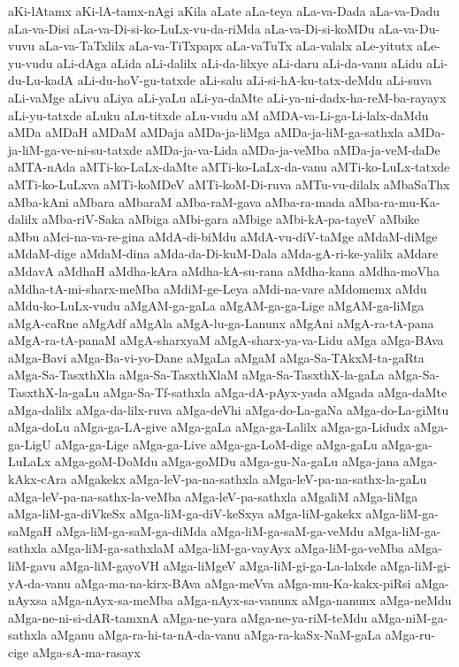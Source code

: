 {aKi-lAtamx
aKi-lA-tamx-nAgi
aKila
aLate
aLa-teya
aLa-va-Dada
aLa-va-Dadu
aLa-va-Disi
aLa-va-Di-si-ko-LuLx-vu-da-riMda
aLa-va-Di-si-koMDu
aLa-va-Du-vuvu
aLa-va-TaTxlilx
aLa-va-TiTxpapx
aLa-vaTuTx
aLa-valalx
aLe-yitutx
aLe-yu-vudu
aLi-dAga
aLida
aLi-dalilx
aLi-da-lilxye
aLi-daru
aLi-da-vanu
aLidu
aLi-du-Lu-kadA
aLi-du-hoV-gu-tatxde
aLi-salu
aLi-si-hA-ku-tatx-deMdu
aLi-suva
aLi-vaMge
aLivu
aLiya
aLi-yaLu
aLi-ya-daMte
aLi-ya-ni-dadx-ha-reM-ba-rayayx
aLi-yu-tatxde
aLuku
aLu-titxde
aLu-vudu
aM
aMDA-va-Li-ga-Li-lalx-daMdu
aMDa
aMDaH
aMDaM
aMDaja
aMDa-ja-liMga
aMDa-ja-liM-ga-sathxla
aMDa-ja-liM-ga-ve-ni-su-tatxde
aMDa-ja-va-Lida
aMDa-ja-veMba
aMDa-ja-veM-daDe
aMTA-nAda
aMTi-ko-LaLx-daMte
aMTi-ko-LaLx-da-vanu
aMTi-ko-LuLx-tatxde
aMTi-ko-LuLxva
aMTi-koMDeV
aMTi-koM-Di-ruva
aMTu-vu-dilalx
aMbaSaThx
aMba-kAni
aMbara
aMbaraM
aMba-raM-gava
aMba-ra-mada
aMba-ra-mu-Ka-dalilx
aMba-riV-Saka
aMbiga
aMbi-gara
aMbige
aMbi-kA-pa-tayeV
aMbike
aMbu
aMci-na-va-re-gina
aMdA-di-biMdu
aMdA-vu-diV-taMge
aMdaM-diMge
aMdaM-dige
aMdaM-dina
aMda-da-Di-kuM-Dala
aMda-gA-ri-ke-yalilx
aMdare
aMdavA
aMdhaH
aMdha-kAra
aMdha-kA-su-rana
aMdha-kana
aMdha-moVha
aMdha-tA-mi-sharx-meMba
aMdiM-ge-Leya
aMdi-na-vare
aMdomemx
aMdu
aMdu-ko-LuLx-vudu
aMgAM-ga-gaLa
aMgAM-ga-ga-Lige
aMgAM-ga-liMga
aMgA-caRne
aMgAdf
aMgAla
aMgA-lu-ga-Lanunx
aMgAni
aMgA-ra-tA-pana
aMgA-ra-tA-panaM
aMgA-sharxyaM
aMgA-sharx-ya-va-Lidu
aMga
aMga-BAva
aMga-Bavi
aMga-Ba-vi-yo-Dane
aMgaLa
aMgaM
aMga-Sa-TAkxM-ta-gaRta
aMga-Sa-TasxthXla
aMga-Sa-TasxthXlaM
aMga-Sa-TasxthX-la-gaLa
aMga-Sa-TasxthX-la-gaLu
aMga-Sa-Tf-sathxla
aMga-dA-pAyx-yada
aMgada
aMga-daMte
aMga-dalilx
aMga-da-lilx-ruva
aMga-deVhi
aMga-do-La-gaNa
aMga-do-La-giMtu
aMga-doLu
aMga-ga-LA-give
aMga-gaLa
aMga-ga-Lalilx
aMga-ga-Lidudx
aMga-ga-LigU
aMga-ga-Lige
aMga-ga-Live
aMga-ga-LoM-dige
aMga-gaLu
aMga-ga-LuLaLx
aMga-goM-DoMdu
aMga-goMDu
aMga-gu-Na-gaLu
aMga-jana
aMga-kAkx-cAra
aMgakekx
aMga-leV-pa-na-sathxla
aMga-leV-pa-na-sathx-la-gaLu
aMga-leV-pa-na-sathx-la-veMba
aMga-leV-pa-sathxla
aMgaliM
aMga-liMga
aMga-liM-ga-diVkeSx
aMga-liM-ga-diV-keSxya
aMga-liM-gakekx
aMga-liM-ga-saMgaH
aMga-liM-ga-saM-ga-diMda
aMga-liM-ga-saM-ga-veMdu
aMga-liM-ga-sathxla
aMga-liM-ga-sathxlaM
aMga-liM-ga-vayAyx
aMga-liM-ga-veMba
aMga-liM-gavu
aMga-liM-gayoVH
aMga-liMgeV
aMga-liM-gi-ga-La-lalxde
aMga-liM-gi-yA-da-vanu
aMga-ma-na-kirx-BAva
aMga-meVva
aMga-mu-Ka-kakx-piRsi
aMga-nAyxsa
aMga-nAyx-sa-meMba
aMga-nAyx-sa-vanunx
aMga-nanunx
aMga-neMdu
aMga-ne-ni-si-dAR-tamxnA
aMga-ne-yara
aMga-ne-ya-riM-teMdu
aMga-niM-ga-sathxla
aMganu
aMga-ra-hi-ta-nA-da-vanu
aMga-ra-kaSx-NaM-gaLa
aMga-ru-cige
aMga-sA-ma-rasayx
}
